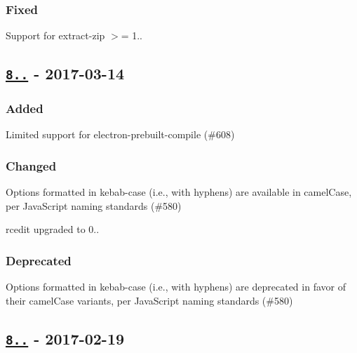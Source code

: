 \subsubsection*{Fixed}


\begin{DoxyItemize}
\item Support for {\ttfamily extract-\/zip} $>$= 1..
\end{DoxyItemize}

\subsection*{\href{https://github.com/electron-userland/electron-packager/compare/v8.5.2...v8.6.0}{\tt 8..} -\/ 2017-\/03-\/14}

\subsubsection*{Added}


\begin{DoxyItemize}
\item Limited support for electron-\/prebuilt-\/compile (\#608)
\end{DoxyItemize}

\subsubsection*{Changed}


\begin{DoxyItemize}
\item Options formatted in kebab-\/case (i.\+e., with hyphens) are available in camel\+Case, per Java\+Script naming standards (\#580)
\item rcedit upgraded to 0..
\end{DoxyItemize}

\subsubsection*{Deprecated}


\begin{DoxyItemize}
\item Options formatted in kebab-\/case (i.\+e., with hyphens) are deprecated in favor of their camel\+Case variants, per Java\+Script naming standards (\#580)
\end{DoxyItemize}

\subsection*{\href{https://github.com/electron-userland/electron-packager/compare/v8.5.1...v8.5.2}{\tt 8..} -\/ 2017-\/02-\/19}

